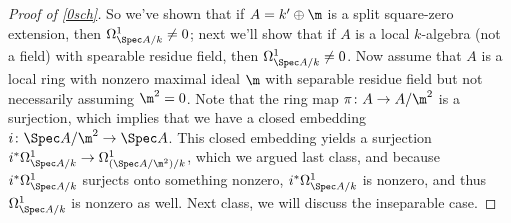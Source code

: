 \begin{proof}[Proof of \cref{0sch}]
So we've shown that if $A = k'\oplus\m$ is a split square-zero extension, then $\Omega_{\Spec A/k}^1\ne 0$; next
we'll show that if $A$ is a local $k$-algebra (not a field) with spearable residue field, then $\Omega_{\Spec
A/k}^1\ne 0$. Now assume that $A$ is a local ring with nonzero maximal ideal $\m$ with separable residue field but
not necessarily assuming $\m^2 = 0$. Note that the ring map $\pi\colon A \to A/\m^2$ is a surjection, which implies
that we have a closed embedding $i\colon \Spec A/\m^2 \to \Spec A$. This closed embedding yields a surjection
$i^*\Omega_{\Spec A/k}^1 \to \Omega_{(\Spec A/\m^2)/k}^1$, which we argued last class, and because
$i^*\Omega_{\Spec A/k}^1$ surjects onto something nonzero, $i^*\Omega_{\Spec A/k}^1$ is nonzero, and thus
$\Omega_{\Spec A/k}^1$ is nonzero as well. Next class, we will discuss the inseparable case.
\end{proof}

